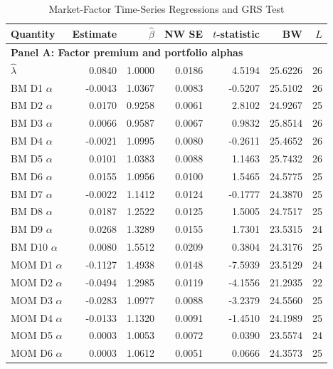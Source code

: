 \documentclass[11pt]{article}
\begin{document}
\begin{table}[H]
  \centering
  \caption{Market-Factor Time-Series Regressions and GRS Test}
  \label{tab:4d-regressions}
  \begin{minipage}{0.99\textwidth}
    \centering
    \scriptsize
    \begin{tabular*}{\linewidth}{@{\extracolsep{\fill}}lrrrrrr@{}}
      \toprule
      Quantity & Estimate & $\hat{\beta}$ & NW SE & $t$-statistic & BW & $L$ \\
      \midrule
      \multicolumn{7}{l}{\textbf{Panel A: Factor premium and portfolio alphas}} \\
      $\hat{\lambda}$ & 0.0840 & 1.0000 & 0.0186 & 4.5194 & 25.6226 & 26 \\
      BM D1 $\alpha$ & -0.0043 & 1.0367 & 0.0083 & -0.5207 & 25.5102 & 26 \\
      BM D2 $\alpha$ & 0.0170 & 0.9258 & 0.0061 & 2.8102 & 24.9267 & 25 \\
      BM D3 $\alpha$ & 0.0066 & 0.9587 & 0.0067 & 0.9832 & 25.8514 & 26 \\
      BM D4 $\alpha$ & -0.0021 & 1.0995 & 0.0080 & -0.2611 & 25.4652 & 26 \\
      BM D5 $\alpha$ & 0.0101 & 1.0383 & 0.0088 & 1.1463 & 25.7432 & 26 \\
      BM D6 $\alpha$ & 0.0155 & 1.0956 & 0.0100 & 1.5465 & 24.5775 & 25 \\
      BM D7 $\alpha$ & -0.0022 & 1.1412 & 0.0124 & -0.1777 & 24.3870 & 25 \\
      BM D8 $\alpha$ & 0.0187 & 1.2522 & 0.0125 & 1.5005 & 24.7517 & 25 \\
      BM D9 $\alpha$ & 0.0268 & 1.3289 & 0.0155 & 1.7301 & 23.5315 & 24 \\
      BM D10 $\alpha$ & 0.0080 & 1.5512 & 0.0209 & 0.3804 & 24.3176 & 25 \\
      MOM D1 $\alpha$ & -0.1127 & 1.4938 & 0.0148 & -7.5939 & 23.5129 & 24 \\
      MOM D2 $\alpha$ & -0.0494 & 1.2985 & 0.0119 & -4.1556 & 21.2935 & 22 \\
      MOM D3 $\alpha$ & -0.0283 & 1.0977 & 0.0088 & -3.2379 & 24.5560 & 25 \\
      MOM D4 $\alpha$ & -0.0133 & 1.1320 & 0.0091 & -1.4510 & 24.1989 & 25 \\
      MOM D5 $\alpha$ & 0.0003 & 1.0053 & 0.0072 & 0.0390 & 23.5574 & 24 \\
      MOM D6 $\alpha$ & 0.0003 & 1.0612 & 0.0051 & 0.0666 & 24.3573 & 25 \\

\end{tabular*}
\end{minipage}
\end{table}
\end{document}
